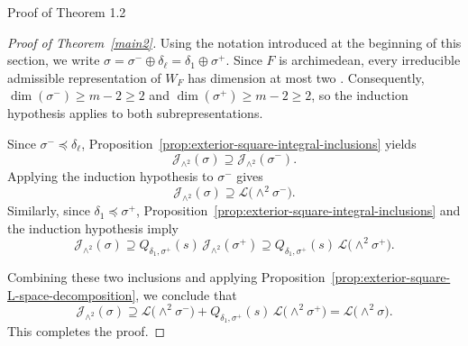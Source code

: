 \documentclass[12pt,reqno]{amsart}
\numberwithin{equation}{section}%
\numberwithin{equation}{subsection}
\theoremstyle{definition}
\theoremstyle{remark}
\begin{document}
\begin{section}{Proof of Theorem 1.2}
\begin{proof}[Proof of Theorem~\ref{main2}]
Using the notation introduced at the beginning of this section, we write $\sigma = \sigma^-\oplus\delta_\ell = \delta_1\oplus\sigma^+$. Since $F$ is archimedean, every irreducible admissible representation of $W_F$ has dimension at most two \cite[p.~403]{Kna1994}. Consequently, $\dim(\sigma^-) \geq m-2 \geq 2$ and $\dim(\sigma^+) \geq m-2 \geq 2$, so the induction hypothesis applies to both subrepresentations.

Since $\sigma^-\preceq\delta_\ell$, Proposition~\ref{prop:exterior-square-integral-inclusions} yields 
$$\mathcal{J}_{\wedge^2}(\sigma) \supseteq \mathcal{J}_{\wedge^2}(\sigma^-).$$
Applying the induction hypothesis to $\sigma^-$ gives
\[
\mathcal{J}_{\wedge^2}(\sigma)
\supseteq
\mathcal{L}\bigl(\wedge^2\sigma^-\bigr).
\]
Similarly, since $\delta_1\preceq\sigma^+$, Proposition~\ref{prop:exterior-square-integral-inclusions} and the induction hypothesis imply
\[
\mathcal{J}_{\wedge^2}(\sigma)
\supseteq
Q_{\delta_1,\sigma^+}(s)\,
\mathcal{J}_{\wedge^2}(\sigma^+)
\supseteq
Q_{\delta_1,\sigma^+}(s)\,
\mathcal{L}\bigl(\wedge^2\sigma^+\bigr).
\]

Combining these two inclusions and applying Proposition~\ref{prop:exterior-square-L-space-decomposition}, we conclude that
\[
\mathcal{J}_{\wedge^2}(\sigma)
\supseteq
\mathcal{L}\bigl(\wedge^2\sigma^-\bigr)
+
Q_{\delta_1,\sigma^+}(s)\,
\mathcal{L}\bigl(\wedge^2\sigma^+\bigr)
=
\mathcal{L}\bigl(\wedge^2\sigma\bigr).
\]
This completes the proof.
\end{proof}
\end{section}
\end{document}
